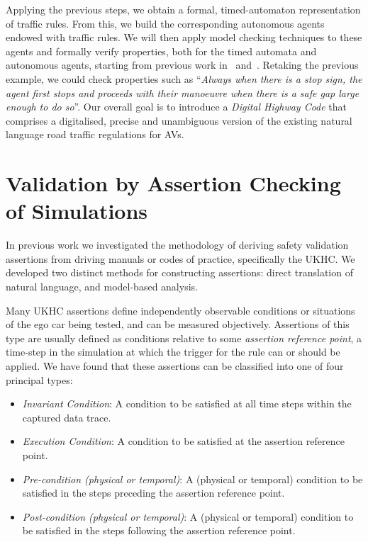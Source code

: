 \documentclass[runningheads,twocolumn,a4paper,10pt]{llncs}
\begin{document}
Applying the previous steps, we obtain a formal, timed-automaton representation of traffic rules.
From this, we build the corresponding autonomous agents endowed with traffic rules.
We will then apply model checking techniques to these agents and formally verify properties, both for the timed automata and autonomous agents, starting from previous work in~\cite{BS19} and~\cite{jsan10030041}. Retaking the previous example, we could check properties such as ``\textit{Always when there is a stop sign, the agent first stops and proceeds with their manoeuvre when there is a safe gap large enough to do so}''. Our overall goal is to introduce a \emph{Digital Highway Code} that comprises a digitalised, precise and unambiguous version of the existing natural language road traffic regulations for AVs.

\section{Validation by Assertion Checking of Simulations}\label{sec:assertions}

In previous work \cite{Harper21} we investigated the methodology of deriving safety validation assertions from driving manuals or codes of practice, specifically the UKHC. We developed two distinct methods for constructing assertions: direct translation of natural language, and model-based analysis.

Many UKHC assertions define independently observable conditions or situations of the ego car being tested, and can be measured objectively. Assertions of this type are usually defined as conditions relative to some \emph{assertion reference point}, a time-step in the simulation at which the trigger for the rule can or should be applied. We have found that these assertions can be classified into one of four principal types: 
\begin{itemize}
    \item \emph{Invariant Condition}: A condition to be satisfied at all time steps within the captured data trace.
    \item \emph{Execution Condition}: A condition to be satisfied at the assertion reference point.
    \item \emph{Pre-condition (physical or temporal)}: A (physical or temporal) condition to be satisfied in the steps preceding the assertion reference point.
    \item \emph{Post-condition (physical or temporal)}: A (physical or temporal) condition to be satisfied in the steps following the assertion reference point.
\end{itemize}
\end{document}
